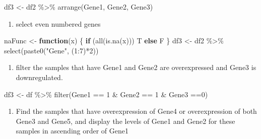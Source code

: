 \documentclass[
]{article}
\newenvironment{Shaded}{\begin{snugshade}}{\end{snugshade}}
\newcommand{\ControlFlowTok}[1]{\textcolor[rgb]{0.13,0.29,0.53}{\textbf{#1}}}
\newcommand{\DecValTok}[1]{\textcolor[rgb]{0.00,0.00,0.81}{#1}}
\newcommand{\FunctionTok}[1]{\textcolor[rgb]{0.00,0.00,0.00}{#1}}
\newcommand{\NormalTok}[1]{#1}
\newcommand{\OtherTok}[1]{\textcolor[rgb]{0.56,0.35,0.01}{#1}}
\newcommand{\SpecialCharTok}[1]{\textcolor[rgb]{0.00,0.00,0.00}{#1}}
\newcommand{\StringTok}[1]{\textcolor[rgb]{0.31,0.60,0.02}{#1}}
\providecommand{\tightlist}{%
  \setlength{\itemsep}{0pt}\setlength{\parskip}{0pt}}
\begin{document}
\begin{Shaded}
\begin{Highlighting}[]
\NormalTok{df3 }\OtherTok{\textless{}{-}}\NormalTok{ df2 }\SpecialCharTok{\%\textgreater{}\%} \FunctionTok{arrange}\NormalTok{(Gene1, Gene2, Gene3)}
\end{Highlighting}
\end{Shaded}

\begin{enumerate}
\def\labelenumi{\arabic{enumi}.}
\setcounter{enumi}{2}
\tightlist
\item
  select even numbered genes
\end{enumerate}

\begin{Shaded}
\begin{Highlighting}[]
\NormalTok{naFunc }\OtherTok{\textless{}{-}} \ControlFlowTok{function}\NormalTok{(x) \{}
    \ControlFlowTok{if}\NormalTok{ (}\FunctionTok{all}\NormalTok{(}\FunctionTok{is.na}\NormalTok{(x)))}
\NormalTok{        T}
    \ControlFlowTok{else}
\NormalTok{        F}
\NormalTok{\}}
\NormalTok{df3 }\OtherTok{\textless{}{-}}\NormalTok{ df2 }\SpecialCharTok{\%\textgreater{}\%} \FunctionTok{select}\NormalTok{(}\FunctionTok{paste0}\NormalTok{(}\StringTok{"Gene"}\NormalTok{, (}\DecValTok{1}\SpecialCharTok{:}\DecValTok{7}\NormalTok{)}\SpecialCharTok{*}\DecValTok{2}\NormalTok{))}
\end{Highlighting}
\end{Shaded}

\begin{enumerate}
\def\labelenumi{\arabic{enumi}.}
\setcounter{enumi}{3}
\tightlist
\item
  filter the samples that have Gene1 and Gene2 are overexpressed and
  Gene3 is downregulated.
\end{enumerate}

\begin{Shaded}
\begin{Highlighting}[]
\NormalTok{df3 }\OtherTok{\textless{}{-}}\NormalTok{ df }\SpecialCharTok{\%\textgreater{}\%} \FunctionTok{filter}\NormalTok{(Gene1 }\SpecialCharTok{==} \DecValTok{1} \SpecialCharTok{\&}\NormalTok{ Gene2 }\SpecialCharTok{==} \DecValTok{1} \SpecialCharTok{\&}\NormalTok{ Gene3 }\SpecialCharTok{==}\DecValTok{0}\NormalTok{)}
\end{Highlighting}
\end{Shaded}

\begin{enumerate}
\def\labelenumi{\arabic{enumi}.}
\setcounter{enumi}{4}
\tightlist
\item
  Find the samples that have overexpression of Gene4 or overexpression
  of both Gene3 and Gene5, and display the levels of Gene1 and Gene2 for
  these samples in ascending order of Gene1
\end{enumerate}
\end{document}
